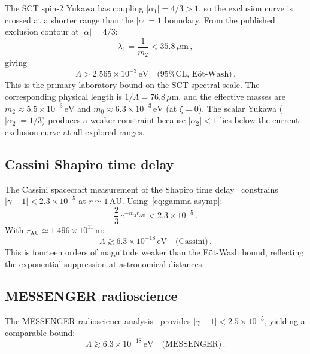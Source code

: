 \documentclass[aps,prd,twocolumn,superscriptaddress,nofootinbib,floatfix]{revtex4-2}
\begin{document}
The SCT spin-2 Yukawa has coupling $|\alpha_1| = 4/3 > 1$, so the
exclusion curve is crossed at a shorter range than the $|\alpha| = 1$
boundary. From the published exclusion contour at $|\alpha| = 4/3$:
\begin{equation}
  \lambda_1 = \frac{1}{m_2} < 35.8\,\mu\mathrm{m}\,,
  \label{eq:eotwash-range}
\end{equation}
giving
\begin{equation}
  \boxed{
    \Lambda > 2.565 \times 10^{-3}\,\mathrm{eV}
    \quad \text{(95\% CL, E\"ot-Wash)}\,.}
  \label{eq:eotwash}
\end{equation}
This is the primary laboratory bound on the SCT spectral scale. The
corresponding physical length is
$1/\Lambda = 76.8\,\mu\mathrm{m}$, and the effective masses are
$m_2 \approx 5.5 \times 10^{-3}\,\mathrm{eV}$ and
$m_0 \approx 6.3 \times 10^{-3}\,\mathrm{eV}$ (at $\xi = 0$).
The scalar Yukawa ($|\alpha_2| = 1/3$) produces a weaker constraint
because $|\alpha_2| < 1$ lies below the current exclusion curve at all
explored ranges.

\subsection{Cassini Shapiro time delay}

The Cassini spacecraft measurement of the Shapiro time
delay~\cite{Bertotti:2003} constrains $|\gamma - 1| < 2.3 \times 10^{-5}$
at $r \simeq 1\,\mathrm{AU}$.
Using~\eqref{eq:gamma-asymp}:
\begin{equation}
  \frac{2}{3}\,e^{-m_2 r_\mathrm{AU}} < 2.3 \times 10^{-5}\,.
\end{equation}
With $r_\mathrm{AU} \simeq 1.496 \times 10^{11}\,\mathrm{m}$:
\begin{equation}
  \Lambda \gtrsim 6.3 \times 10^{-18}\,\mathrm{eV}
  \quad \text{(Cassini)}\,.
  \label{eq:cassini}
\end{equation}
This is fourteen orders of magnitude weaker than the E\"ot-Wash bound,
reflecting the exponential suppression at astronomical distances.

\subsection{MESSENGER radioscience}

The MESSENGER radioscience analysis~\cite{Verma:2014} provides
$|\gamma - 1| < 2.5 \times 10^{-5}$, yielding a comparable bound:
\begin{equation}
  \Lambda \gtrsim 6.3 \times 10^{-18}\,\mathrm{eV}
  \quad \text{(MESSENGER)}\,.
  \label{eq:messenger}
\end{equation}
\end{document}

